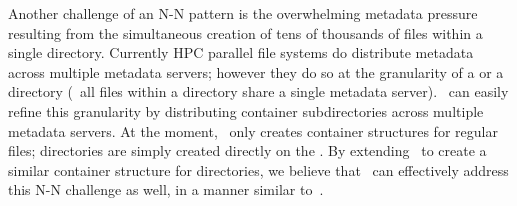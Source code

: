 Another challenge of an N-N pattern is the
overwhelming metadata pressure resulting from the simultaneous creation of tens
of thousands of files within a single directory.  Currently HPC parallel file
systems do distribute metadata across multiple metadata servers; however they do so
at the granularity of a  or a directory (\ie\ all files within a
directory share a single metadata server).  \plfs\ can easily refine this
granularity by distributing container subdirectories 
across multiple metadata servers.  At the moment, \plfs\ only creates container
structures for regular files; directories are simply created directly on the
\upfs.  By extending \plfs\ to create a similar container structure for
directories, we believe that \plfs\ can effectively address this N-N challenge
as well, in a manner similar to~\cite{gigaplus}.
